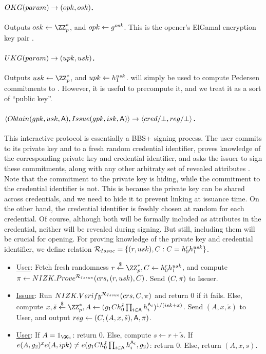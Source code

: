 \paragraph{$OKG(param) \rightarrow (opk,osk)$.} %
Outputs $\osk \gets \ZZ^*_p$, and $opk \gets g^{osk}$. This is the
opener's ElGamal encryption key pair \needcite.

\paragraph{$UKG(param) \rightarrow (upk,usk)$.} %
Outputs $\usk \gets \ZZ^*_p$, and $upk \gets h_1^{usk}$. \upk will
simply be used to compute Pedersen commitments \needcite to \usk. However,
it is useful to precompute it, and we treat it as a sort of ``public key''.

\paragraph{$\langle Obtain(gpk,usk,\mathsf{A}),Issue(gpk,isk,\mathsf{A}) \rangle
  \rightarrow \langle cred/\bot,reg/\bot \rangle$.} %
This interactive protocol is essentially a BBS+ signing  process. The user
commits to its private key and to a fresh random credential identifier, proves
knowledge of the corresponding private key and credential identifier, and
asks the issuer to sign these commitments, along with any other arbitraty set
of revealed attributes \Attrs. Note that the commitment to the private key is
hiding, while the commitment to the credential identifier is not. This is
because the private key can be shared across credentials, and we need to hide
it to prevent linking at issuance time. On the other hand, the credential
identifier is freshly chosen at random for each credential. Of course, although
both will be formally included as attributes in the credential, neither will be
revealed during signing. But still, including them will be crucial for opening.
For proving knowledge of the private key and credential identifier, we define
relation $\mathcal{R}_{Issue} = \lbrace (r, usk), C: C =
h_0^rh_1^{usk}\rbrace$.

\begin{itemize}
\item \underline{User}: Fetch fresh randomness $r \getr \ZZ^*_p,
  \Ccom \gets \gen{h}_0^r\gen{h}_1^{\usk}$, and compute $\pi \gets
  NIZK.Prove^{\mathcal{R}_{Issue}}(crs,(r,usk),
  C)$. Send $(C,\pi)$ to Issuer.
\item \underline{Issuer}: Run $NIZK.Verify^{\mathcal{R}_{Issue}}(crs,C,
  \pi)$ and return $0$ if it fails. Else, compute
  $x,\tilde{s} \getr \ZZ^*_p, A \gets
  (\gen{g}_1\Ccom h_0^{\tilde{s}} \prod_{i \in \Attrs}
  \gen{h}_i^{\Attrs_i})^{1/(\isk+x)}$.
  Send $(A,x,\tilde{s})$ to User, and output $reg \gets
  (C,(A,x,\tilde{s}),\mathsf{A},\pi)$.
\item \underline{User}: If $A = 1_{\GG_1}$: return $0$. Else, compute
  $s \gets r + \tilde{s}$. If $e(A,g_2)^xe(A,ipk) \neq
  e(g_1Ch_0^{\tilde{s}}\prod_{i \in \mathsf{A}}h_i^{\mathsf{A}_i},
  g_2)$: return $0$. Else, return
  $(A,x,s)$.
\end{itemize}

